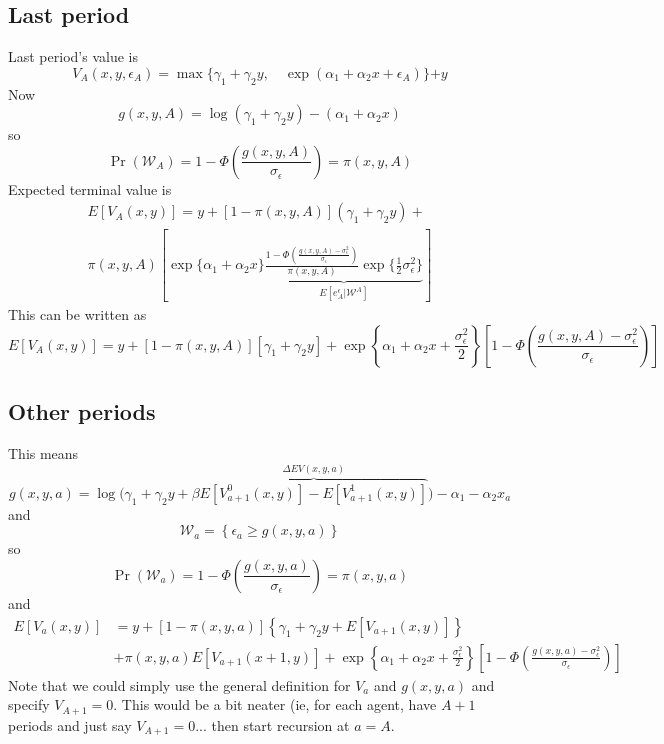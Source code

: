 \documentclass[11pt,letterpaper]{article}
\begin{document}
\subsection{Last period}

Last period's value is
\[
V_A(x,y,\epsilon_A) = \max \{ \gamma_1 + \gamma_2 y, \quad \exp(\alpha_1 + \alpha_2 x + \epsilon_A) \}{+ y}
\]
Now
\[
g(x,y,A) = \log(\gamma_1 + \gamma_2 y) - (\alpha_1 + \alpha_2 x)
\]
so 
\[
\Pr(\mathcal W_A) = 1- \Phi\left(\frac{g(x,y,A)}{\sigma_\epsilon} \right) = \pi(x,y,A)
\]
Expected terminal value is
\begin{multline*}
E[V_A(x,y)] = {y +}
    [1-\pi(x,y,A)]\left(\gamma_1 + \gamma_2 y\right)  + \\
    \pi(x,y,A)    \left[{\exp\{\alpha_1 + \alpha_2 x\}} \underbrace{
    \frac{ 1-\Phi\left( \frac{g(x,y,A) - \sigma_\epsilon^2}{\sigma_\epsilon} \right)}
    {\pi(x,y,A)} \exp\{\frac{1}{2}\sigma^2_\epsilon\} }_{E[e^\epsilon_A|\mathcal W^A]} \right]
\end{multline*}
This can be written as
\[
E[V_A(x,y)] = {y} + 
    [1-\pi(x,y,A)]\left[\gamma_1 + \gamma_2 y\right]  + 
    { \exp\left\{\alpha_1 + \alpha_2 x + \frac{\sigma_\epsilon^2}{2}\right\}}
    \left[1-\Phi\left( \frac{g(x,y,A) - \sigma_\epsilon^2}{\sigma_\epsilon} \right)\right] 
\]

\subsection{Other periods}
This means
\[
    g(x,y,a) = \log \bigg( \gamma_1 + \gamma_2 y + \beta\overbrace{E[V_{a+1}^0(x,y)] - E[V_{a+1}^1(x,y)]}^{\Delta EV(x,y,a)} \bigg) - \alpha_1 - \alpha_2 x_a 
\]
and
\[
\mathcal W_a = \left\{\epsilon_a \geq g(x,y,a) \right\}
\]
so
\[
\Pr(\mathcal W_a) = 1- \Phi\left(\frac{g(x,y,a)}{\sigma_\epsilon} \right) = \pi(x,y,a)
\]
and
\begin{align*}
E[V_a(x,y)] 
&= {y}  
+ [1-\pi(x,y,a)]\left\{\gamma_1 + \gamma_2 y + E[V_{a+1}(x,y)] \right\}  \\ 
&+ \pi(x,y,a)E[V_{a+1}(x+1,y)] + { \exp\left\{\alpha_1 + \alpha_2 x + \frac{\sigma_\epsilon^2}{2}\right\}}
    \left[1-\Phi\left( \frac{g(x,y,a) - \sigma_\epsilon^2}{\sigma_\epsilon} \right)\right] 
\end{align*}
Note that we could simply use the general definition for $V_a$ and $g(x,y,a)$ and specify $V_{A+1} = 0$. This would be a bit neater (ie, for each agent, have $A+1$ periods and just say $V_{A+1} = 0$... then start recursion at $a=A$.  
\end{document}
